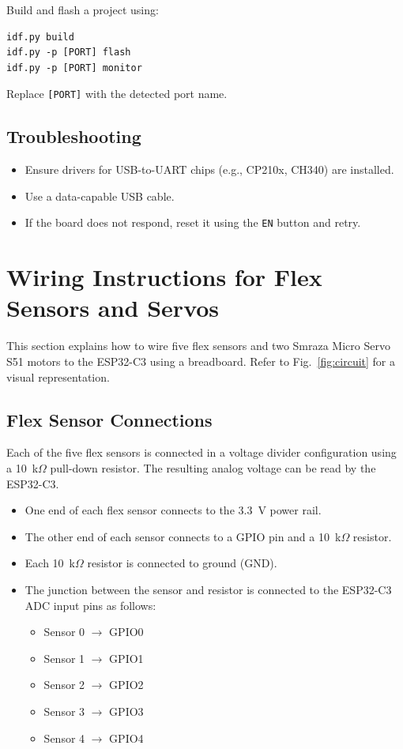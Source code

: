 \documentclass[conference]{IEEEtran}
\begin{document}
Build and flash a project using:

\begin{lstlisting}
idf.py build
idf.py -p [PORT] flash
idf.py -p [PORT] monitor
\end{lstlisting}

Replace \texttt{[PORT]} with the detected port name.

\subsection{Troubleshooting}
\begin{itemize}
    \item Ensure drivers for USB-to-UART chips (e.g., CP210x, CH340) are installed.
    \item Use a data-capable USB cable.
    \item If the board does not respond, reset it using the \texttt{EN} button and retry.
\end{itemize}

\section{Wiring Instructions for Flex Sensors and Servos}

This section explains how to wire five flex sensors and two Smraza Micro Servo S51 motors to the ESP32-C3 using a breadboard. Refer to Fig.~\ref{fig:circuit} for a visual representation.

\subsection{Flex Sensor Connections}

Each of the five flex sensors is connected in a voltage divider configuration using a 10~k$\Omega$ pull-down resistor. The resulting analog voltage can be read by the ESP32-C3.

\begin{itemize}
    \item One end of each flex sensor connects to the 3.3~V power rail.
    \item The other end of each sensor connects to a GPIO pin and a 10~k$\Omega$ resistor.
    \item Each 10~k$\Omega$ resistor is connected to ground (GND).
    \item The junction between the sensor and resistor is connected to the ESP32-C3 ADC input pins as follows:
    \begin{itemize}
        \item Sensor 0 $\rightarrow$ GPIO0
        \item Sensor 1 $\rightarrow$ GPIO1
        \item Sensor 2 $\rightarrow$ GPIO2
        \item Sensor 3 $\rightarrow$ GPIO3
        \item Sensor 4 $\rightarrow$ GPIO4
    \end{itemize}
\end{itemize}
\end{document}
